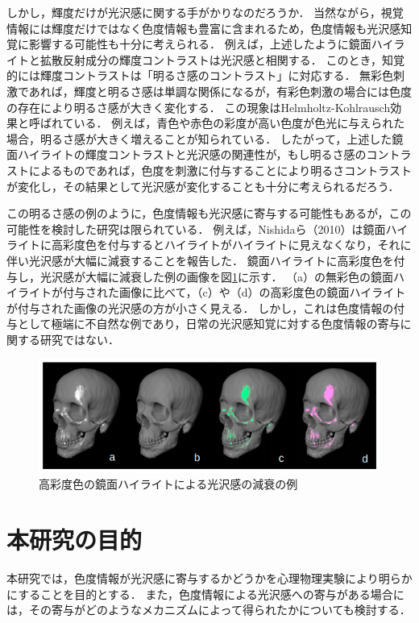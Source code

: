        しかし，輝度だけが光沢感に関する手がかりなのだろうか．
        当然ながら，視覚情報には輝度だけではなく色度情報も豊富に含まれるため，色度情報も光沢感知覚に影響する可能性も十分に考えられる．
        例えば，上述したように鏡面ハイライトと拡散反射成分の輝度コントラストは光沢感と相関する．
        このとき，知覚的には輝度コントラストは「明るさ感のコントラスト」に対応する．
        無彩色刺激であれば，輝度と明るさ感は単調な関係になるが，有彩色刺激の場合には色度の存在により明るさ感が大きく変化する．
        この現象はHelmholtz-Kohlrausch効果と呼ばれている\cite{HKeffect}．
        例えば，青色や赤色の彩度が高い色度が色光に与えられた場合，明るさ感が大きく増えることが知られている．
        したがって，上述した鏡面ハイライトの輝度コントラストと光沢感の関連性が，もし明るさ感のコントラストによるものであれば，色度を刺激に付与することにより明るさコントラストが変化し，その結果として光沢感が変化することも十分に考えられるだろう．

        この明るさ感の例のように，色度情報も光沢感に寄与する可能性もあるが，この可能性を検討した研究は限られている．
        例えば，Nishidaら（2010）は鏡面ハイライトに高彩度色を付与するとハイライトがハイライトに見えなくなり，それに伴い光沢感が大幅に減衰することを報告した\cite{Nishida}．
        鏡面ハイライトに高彩度色を付与し，光沢感が大幅に減衰した例の画像を図\ref{SaturatedLowGloss}に示す．
        （a）の無彩色の鏡面ハイライトが付与された画像に比べて，（c）や（d）の高彩度色の鏡面ハイライトが付与された画像の光沢感の方が小さく見える．
        しかし，これは色度情報の付与として極端に不自然な例であり，日常の光沢感知覚に対する色度情報の寄与に関する研究ではない．

        \begin{figure}[h]
            \centering
            \includegraphics[width=15.0cm]{./img/SaturatedLowGloss.png}
            \caption{高彩度色の鏡面ハイライトによる光沢感の減衰の例}
            \label{SaturatedLowGloss}
        \end{figure}


    \section{本研究の目的}
        本研究では，色度情報が光沢感に寄与するかどうかを心理物理実験により明らかにすることを目的とする．
        また，色度情報による光沢感への寄与がある場合には，その寄与がどのようなメカニズムによって得られたかについても検討する．

